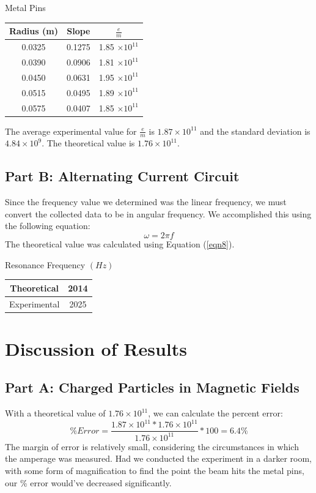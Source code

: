 \documentclass[titlepage]{article}
\begin{document}
\begin{center}\label{tbl2a}
Metal Pins

\begin{tabular}{ccc}
\hline
Radius (m) & Slope & $\frac{e}{m}$\\
\hline
0.0325 & 0.1275 & 1.85 $\times 10^{11}$\\
\hline
0.0390 & 0.0906 & 1.81 $\times 10^{11}$\\
\hline
0.0450 & 0.0631 & 1.95 $\times 10^{11}$\\
\hline
0.0515 & 0.0495 & 1.89 $\times 10^{11}$\\
\hline
0.0575 & 0.0407 & 1.85 $\times 10^{11}$\\
\hline
\end{tabular}
\end{center}

The average experimental value for $\frac{e}{m}$ is $1.87 \times 10^{11}$ and the standard deviation is $4.84 \times 10^9$. The theoretical value is $1.76 \times 10^{11}$.

\subsection{Part B: Alternating Current Circuit}\label{sub:part_b_alternating_current_circuit-aod}
Since the frequency value we determined was the linear frequency, we must convert the collected data to be in angular frequency. We accomplished this using the following equation:
\[
	\omega = 2 \pi f
\]
The theoretical value was calculated using Equation (\ref{eqn8}).

\begin{center}\label{tblb1}
	Resonance Frequency $(Hz)$
	
	\begin{tabular}{cc}
	\hline
	Theoretical & 2014\\
	\hline
	Experimental & 2025\\
	\hline
	\end{tabular}
	
\end{center}

\section{Discussion of Results}\label{sec:discussion_of_results}
\subsection{Part A: Charged Particles in Magnetic Fields}\label{sub:part_a_charged_particles_in_magnetic_fields-dor}
With a theoretical value of $1.76 \times 10^{11}$, we can calculate the percent error:
\[
	\% Error = \frac{1.87 \times 10^{11} * 1.76 \times 10^{11}}{1.76 \times 10^{11}} * 100 = 6.4\%
\]
The margin of error is relatively small, considering the circumstances in which the amperage was measured. Had we conducted the experiment in a darker room, with some form of magnification to find the point the beam hits the metal pins, our \% error would've decreased significantly.
\end{document}
